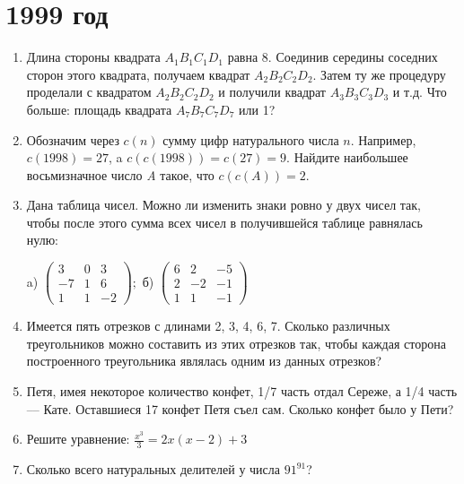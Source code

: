 \documentclass[12pt]{article}
\begin{document}
\section*{1999 год}
\begin{enumerate}
\item Длина стороны квадрата $A_1B_1C_1D_1$ равна 8. Соединив середины соседних сторон этого квадрата, получаем квадрат $A_2B_2C_2D_2$. Затем ту же
процедуру проделали с квадратом $A_2B_2C_2D_2$ и получили квадрат
$A_3B_3C_3D_3$ и т.д. Что больше: площадь квадрата $A_7B_7C_7D_7$ или 1? 
\item Обозначим через $c(n)$ сумму цифр натурального числа $n$. Например,
$c(1998) = 27$, a $c(c(1998)) = c(27) = 9$. Найдите наибольшее восьмизначное число \textit{A} такое, что $c(c(A))= 2$. 
\item Дана таблица чисел. Можно ли изменить знаки ровно у двух чисел так,
чтобы после этого сумма всех чисел в получившейся таблице равнялась нулю:

a) 
$\begin{pmatrix}
  3 & 0 & 3\\
  -7 & 1 & 6\\
  1 & 1 & -2
\end{pmatrix}; $
\hspace{20pt}
б)
$\begin{pmatrix}
  6 & 2 & -5\\
  2 & -2 & -1\\
  1 & 1 & -1
\end{pmatrix} $
\item Имеется пять отрезков с длинами 2, 3, 4, 6, 7. Сколько различных треугольников можно составить из этих отрезков так, чтобы каждая сторона построенного треугольника являлась одним из данных отрезков? 
\item Петя, имея некоторое количество конфет, 1/7 часть отдал Сереже, а 1/4
часть --– Кате. Оставшиеся 17 конфет Петя съел сам. Сколько конфет
было у Пети? 
\item Решите уравнение: $\frac{x^3}{3} = 2x(x-2) + 3$ 
\item Сколько всего натуральных делителей у числа $91^{91}$? 
\end{enumerate}
\end{document}

